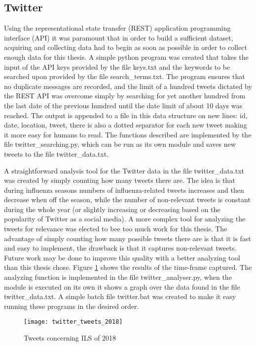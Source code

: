 \subsection{Twitter}
Using the representational state transfer (REST) application programming interface (API) it was paramount that in order to build a sufficient dataset, acquiring and collecting data had to begin as soon as possible in order to collect enough data for this thesis. A simple python program was created that takes the input of the API keys provided by the file keys.txt and the keywords to be searched upon provided by the file search\_terms.txt. The program ensures that no duplicate messages are recorded, and the limit of a hundred tweets dictated by the REST API was overcome simply by searching for yet another hundred from the last date of the previous hundred until the date limit of about 10 days was reached.
The output is appended to a file in this data structure on new lines: id, date, location, tweet, there is also a dotted separator for each new tweet making it more easy for humans to read. The functions described are implemented by the file twitter\_searching.py, which can be run as its own module and saves new tweets to the file twitter\_data.txt.

A straightforward analysis tool for the Twitter data in the file twitter\_data.txt was created by simply counting how many tweets there are. The idea is that during influenza seasons numbers of influenza-related tweets increases and then decrease when off the season, while the number of non-relevant tweets is constant during the whole year (or slightly increasing or decreasing based on the popularity of Twitter as a social media). A more complex tool for analyzing the tweets for relevance was elected to bee too much work for this thesis. The advantage of simply counting how many possible tweets there are is that it is fast and easy to implement, the drawback is that it captures non-relevant tweets. Future work may be done to improve this quality with a better analyzing tool than this thesis chose. Figure \ref{fig:twitterAnal} shows the results of the time-frame captured. The analyzing function is implemented in the file twitter\_analyser.py, when the module is executed on its own it shows a graph over the data found in the file twitter\_data.txt. A simple batch file twitter.bat was created to make it easy running these programs in the desired order.

\begin{figure}[ht]
\texttt{[image: twitter\_tweets\_2018]}
\centering
\caption{Tweets concerning ILS of 2018}
\label{fig:twitterAnal}
\end{figure}









